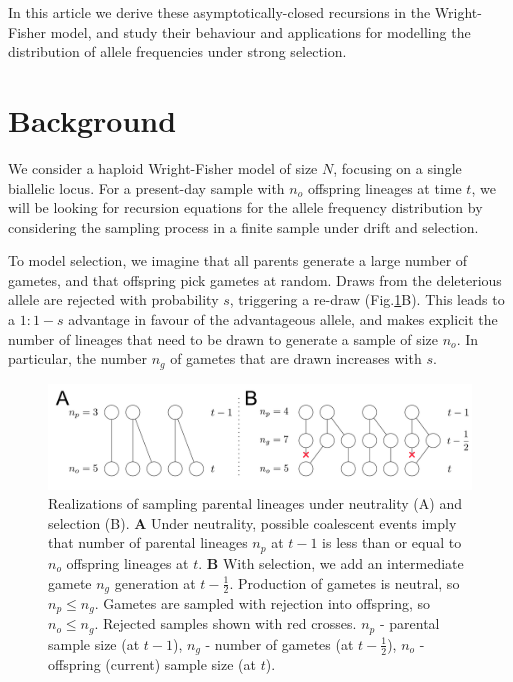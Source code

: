 \documentclass[review]{elsarticle}
\begin{document}
In this article we derive these asymptotically-closed recursions in the
Wright-Fisher model, and study their behaviour and applications for modelling
the distribution of allele frequencies under strong selection.


\section{Background}
\label{sec:background}

We consider a haploid Wright-Fisher model of size $N$, focusing on a single
biallelic locus. For a present-day sample with $n_o$ offspring lineages at time
$t$, we will be looking for recursion equations for the allele frequency
distribution by considering the sampling process in a finite sample under
drift and selection.   

To model selection, we imagine that all parents generate a large number of
gametes, and that offspring pick gametes at random. Draws from the deleterious
allele are rejected with probability $s$, triggering a re-draw
(Fig.\ref{fig:schematic}B). This leads to a $1:1-s$ advantage in favour of the
advantageous allele, and makes explicit the number of lineages that need to be
drawn to generate a sample of size $n_o$.  In particular, the number $n_g$ of
gametes that are drawn increases with $s$. 

\begin{figure}[ht]
  \centering
  \includegraphics[width=1.0\textwidth]{fig/schematic.pdf}
  \caption{\label{fig:schematic} Realizations of sampling parental lineages under neutrality (A) and
    selection (B). \textbf{A} Under neutrality, possible coalescent events imply that number of
    parental lineages $n_p$ at $t-1$ is less than or equal to $n_o$ offspring lineages at $t$.
    \textbf{B} With selection, we add an intermediate gamete $n_g$ generation at $t-\frac{1}{2}$.
    Production of gametes is neutral, so $n_p\le n_g$. Gametes are sampled with rejection into
    offspring, so $n_o \le n_g$. Rejected samples shown with red crosses. $n_p$ - parental sample
    size (at $t-1$), $n_g$ - number of gametes (at $t-\frac{1}{2}$), $n_o$ - offspring (current)
    sample size (at $t$).}
\end{figure}
\end{document}
